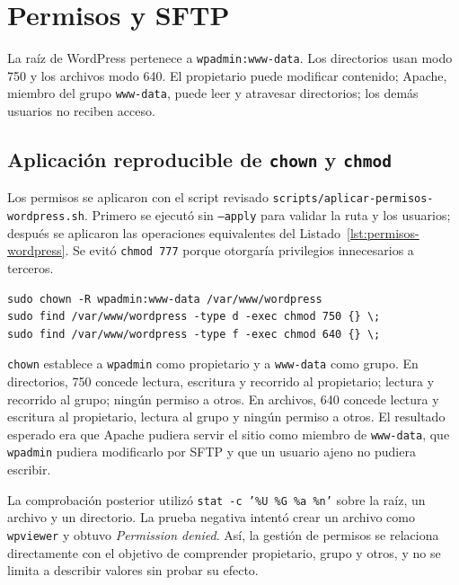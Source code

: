 \section{Permisos y SFTP}

La raíz de WordPress pertenece a \texttt{wpadmin:www-data}. Los directorios usan modo 750 y los archivos modo 640. El propietario puede modificar contenido; Apache, miembro del grupo \texttt{www-data}, puede leer y atravesar directorios; los demás usuarios no reciben acceso.

\subsection{Aplicación reproducible de \texttt{chown} y \texttt{chmod}}

Los permisos se aplicaron con el script revisado \texttt{scripts/aplicar-permisos-wordpress.sh}. Primero se ejecutó sin \texttt{--apply} para validar la ruta y los usuarios; después se aplicaron las operaciones equivalentes del Listado~\ref{lst:permisos-wordpress}. Se evitó \texttt{chmod 777} porque otorgaría privilegios innecesarios a terceros.

\begin{lstlisting}[caption={Comandos aplicados a la carpeta de WordPress.},label={lst:permisos-wordpress}]
sudo chown -R wpadmin:www-data /var/www/wordpress
sudo find /var/www/wordpress -type d -exec chmod 750 {} \;
sudo find /var/www/wordpress -type f -exec chmod 640 {} \;
\end{lstlisting}

\texttt{chown} establece a \texttt{wpadmin} como propietario y a \texttt{www-data} como grupo. En directorios, 750 concede lectura, escritura y recorrido al propietario; lectura y recorrido al grupo; ningún permiso a otros. En archivos, 640 concede lectura y escritura al propietario, lectura al grupo y ningún permiso a otros. El resultado esperado era que Apache pudiera servir el sitio como miembro de \texttt{www-data}, que \texttt{wpadmin} pudiera modificarlo por SFTP y que un usuario ajeno no pudiera escribir.

La comprobación posterior utilizó \texttt{stat -c '\%U \%G \%a \%n'} sobre la raíz, un archivo y un directorio. La prueba negativa intentó crear un archivo como \texttt{wpviewer} y obtuvo \textit{Permission denied}. Así, la gestión de permisos se relaciona directamente con el objetivo de comprender propietario, grupo y otros, y no se limita a describir valores sin probar su efecto.

